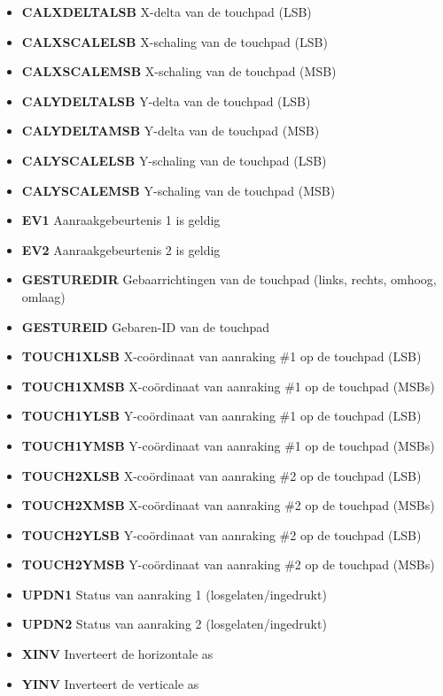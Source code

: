 \begin{itemize}
\item{\bf{CALXDELTALSB}} X-delta van de touchpad (LSB)
\item{\bf{CALXSCALELSB}} X-schaling van de touchpad (LSB)
\item{\bf{CALXSCALEMSB}} X-schaling van de touchpad (MSB)
\item{\bf{CALYDELTALSB}} Y-delta van de touchpad (LSB)
\item{\bf{CALYDELTAMSB}} Y-delta van de touchpad (MSB)
\item{\bf{CALYSCALELSB}} Y-schaling van de touchpad (LSB)
\item{\bf{CALYSCALEMSB}} Y-schaling van de touchpad (MSB)
\item{\bf{EV1}} Aanraakgebeurtenis 1 is geldig
\item{\bf{EV2}} Aanraakgebeurtenis 2 is geldig
\item{\bf{GESTUREDIR}} Gebaarrichtingen van de touchpad (links, rechts, omhoog, omlaag)
\item{\bf{GESTUREID}} Gebaren-ID van de touchpad
\item{\bf{TOUCH1XLSB}} X-coördinaat van aanraking \#1 op de touchpad (LSB)
\item{\bf{TOUCH1XMSB}} X-coördinaat van aanraking \#1 op de touchpad (MSBs)
\item{\bf{TOUCH1YLSB}} Y-coördinaat van aanraking \#1 op de touchpad (LSB)
\item{\bf{TOUCH1YMSB}} Y-coördinaat van aanraking \#1 op de touchpad (MSBs)
\item{\bf{TOUCH2XLSB}} X-coördinaat van aanraking \#2 op de touchpad (LSB)
\item{\bf{TOUCH2XMSB}} X-coördinaat van aanraking \#2 op de touchpad (MSBs)
\item{\bf{TOUCH2YLSB}} Y-coördinaat van aanraking \#2 op de touchpad (LSB)
\item{\bf{TOUCH2YMSB}} Y-coördinaat van aanraking \#2 op de touchpad (MSBs)
\item{\bf{UPDN1}} Status van aanraking 1 (losgelaten/ingedrukt)
\item{\bf{UPDN2}} Status van aanraking 2 (losgelaten/ingedrukt)
\item{\bf{XINV}} Inverteert de horizontale as
\item{\bf{YINV}} Inverteert de verticale as
\end{itemize}
